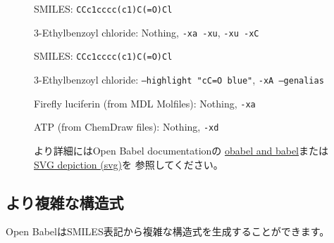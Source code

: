 \documentclass[12pt]{ltjsarticle}
\def\Lcode#1{\texttt{#1}}
\begin{document}
\begin{figure}[ht]
  \centering
   \hspace{1cm}
   \hspace{1cm}
  \caption{3-Ethylbenzoyl chloride: Nothing, \Lcode{-xa -xu}, \Lcode{-xu -xC}}
  SMILES: \verb|CCc1cccc(c1)C(=O)Cl|
\end{figure}

\begin{figure}[ht]
  \centering
   \hspace{1cm}
  \caption{3-Ethylbenzoyl chloride: \Lcode{--highlight "cC=O blue"}, \Lcode{-xA --genalias}}
  SMILES: \verb|CCc1cccc(c1)C(=O)Cl|
\end{figure}

\begin{figure}[ht]
  \centering
   \hspace{1cm}
  \caption{Firefly luciferin (from MDL Molfiles): Nothing, \Lcode{-xa}}
\end{figure}

\begin{figure}[ht]
  \centering
   \hspace{1cm}
  \caption{ATP (from ChemDraw files): Nothing, \Lcode{-xd}}
\end{figure}

\begin{figure}[ht]
より詳細にはOpen Babel documentationの
\href{http://openbabel.org/docs/dev/Command-line_tools/babel.html}{obabel and babel}または
\href{http://openbabel.org/docs/dev/FileFormats/SVG_2D_depiction.html}{SVG depiction (svg)}を
参照してください。
\end{figure}

\clearpage

\subsection{より複雑な構造式}

Open BabelはSMILES表記から複雑な構造式を生成することができます。
\end{document}
